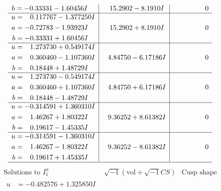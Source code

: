 \documentclass[1p]{elsarticle_modified}
\theoremstyle{definition}
\newcommand{\I}{\sqrt{-1}}
\begin{document}
$$\begin{array}{c|c|c}
\begin{aligned}
b &= -0.33331 - 1.60456 I\end{aligned}
 & \phantom{-}15.2902 - 8.1910 I & \phantom{-0.000000 } 0 \\ \hline\begin{aligned}
u &= \phantom{-}0.117767 - 1.377250 I \\
a &= -0.72783 - 1.93923 I \\
b &= -0.33331 + 1.60456 I\end{aligned}
 & \phantom{-}15.2902 + 8.1910 I & \phantom{-0.000000 } 0 \\ \hline\begin{aligned}
u &= \phantom{-}1.273730 + 0.549174 I \\
a &= \phantom{-}0.360460 - 1.107360 I \\
b &= \phantom{-}0.18448 + 1.48729 I\end{aligned}
 & \phantom{-}4.84750 - 6.17186 I & \phantom{-0.000000 } 0 \\ \hline\begin{aligned}
u &= \phantom{-}1.273730 - 0.549174 I \\
a &= \phantom{-}0.360460 + 1.107360 I \\
b &= \phantom{-}0.18448 - 1.48729 I\end{aligned}
 & \phantom{-}4.84750 + 6.17186 I & \phantom{-0.000000 } 0 \\ \hline\begin{aligned}
u &= -0.314591 + 1.360310 I \\
a &= \phantom{-}1.46267 + 1.80322 I \\
b &= \phantom{-}0.19617 - 1.45335 I\end{aligned}
 & \phantom{-}9.36252 + 8.61382 I & \phantom{-0.000000 } 0 \\ \hline\begin{aligned}
u &= -0.314591 - 1.360310 I \\
a &= \phantom{-}1.46267 - 1.80322 I \\
b &= \phantom{-}0.19617 + 1.45335 I\end{aligned}
 & \phantom{-}9.36252 - 8.61382 I & \phantom{-0.000000 } 0\\
 \hline 
 \end{array}$$\newpage$$\begin{array}{c|c|c}  
\text{Solutions to }I^u_{1}& \I (\text{vol} + \sqrt{-1}CS) & \text{Cusp shape}\\
 \hline 
\begin{aligned}
u &= -0.482576 + 1.325850 I \\

\end{aligned}
\end{array}$$
\end{document}
